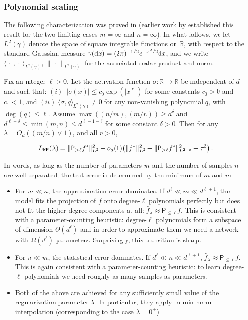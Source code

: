 \subsubsection{Polynomial scaling}
\label{sec:RF_Polynomial}

The following characterization was proved in \cite{mei2020generalization} (earlier work by \cite{ghorbani2020linearized} established this result for the two limiting cases $m=\infty$ and $n=\infty$). In what follows, we let $L^2(\gamma)$ denote the space of square integrable functions on ${\mathbb R}$, with respect to the standard Gaussian measure
$\gamma({\rm d} x) = (2\pi)^{-1/2}e^{-x^2/2}{\rm d} x$, and we write $\langle\,\cdot\, ,\,\cdot\,\rangle_{L^2(\gamma)}$, $\|\,\cdot\,\|_{L^2(\gamma)}$
for the associated scalar product and norm.

\begin{theorem}\label{thm:RFPolynomial}
  Fix an integer $\ell>0$. Let the activation function $\sigma:{\mathbb R}\to{\mathbb R}$ be independent of $d$ and such that:
  $(i)$~$|\sigma(x)|\le c_0\exp(|x|^{c_1})$ for some constants $c_0>0$ and $c_1<1$, and $(ii)$ $\langle\sigma, q\rangle_{L^2(\gamma)} \neq 0$ for any non-vanishing polynomial $q$, with $\deg(q)\le \ell$.
  Assume  $\max((n/m),(m/n) )\ge  d^{\delta}$ and
  $d^{\ell+\delta}\le \min(m,n) \le d^{\ell+1-\delta}$ for some constant $\delta>0$. Then  for any $\lambda = O_d((m/n)\vee 1)$, and all $\eta>0$,

  \begin{align}
    {L}_{{\sf RF}}(\lambda) = \|{\mathsf P}_{>\ell} f^*\|_{L^2}^2 +o_d(1) \big(\| f^*\|_{L^2}^2+\| {\mathsf P}_{>\ell}f^*\|_{L^{2+\eta}}^2+\tau^2\big)\, .
  \end{align}
\end{theorem}

In words, as long as the number of parameters $m$ and the number of samples $n$ are well separated, the test error is determined by the minimum of $m$ and $n$:

\begin{itemize}
\item For $m\ll n$, the approximation error dominates. If $d^{\ell}\ll m\ll d^{\ell+1}$, the model fits the projection of $f$ onto
  degree-$\ell$ polynomials perfectly but does not fit the higher degree components at all: ${\widehat f}_{\lambda}\approx {\mathsf P}_{\le\ell}f$.
  This is consistent with a parameter-counting heuristic: degree-$\ell$ polynomials form a subspace of dimension $\Theta(d^{\ell})$
  and in order to approximate them we need a network with $\Omega(d^{\ell})$ parameters. Surprisingly, this transition is sharp.   
\item For $n\ll m$, the statistical error dominates. If $d^{\ell}\ll n\ll d^{\ell+1}$, ${\widehat f}_{\lambda}\approx {\mathsf P}_{\le\ell}f$.
  This is again consistent with a parameter-counting heuristic: to learn degree-$\ell$ polynomials we need roughly as many samples as parameters.
\item Both of the above are achieved for any sufficiently small value of the regularization parameter $\lambda$. In particular, they apply to min-norm interpolation (corresponding to the case $\lambda=0^+$).
\end{itemize}


